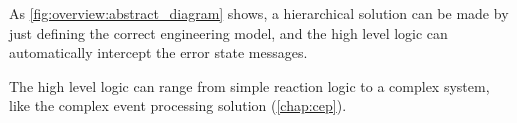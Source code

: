 As \cref{fig:overview:abstract_diagram} shows, a hierarchical solution can be made by just defining the correct engineering model, and the high level logic can automatically intercept the error state messages.

The high level logic can range from simple reaction logic to a complex system, like the complex event processing solution (\vref{chap:cep}).
